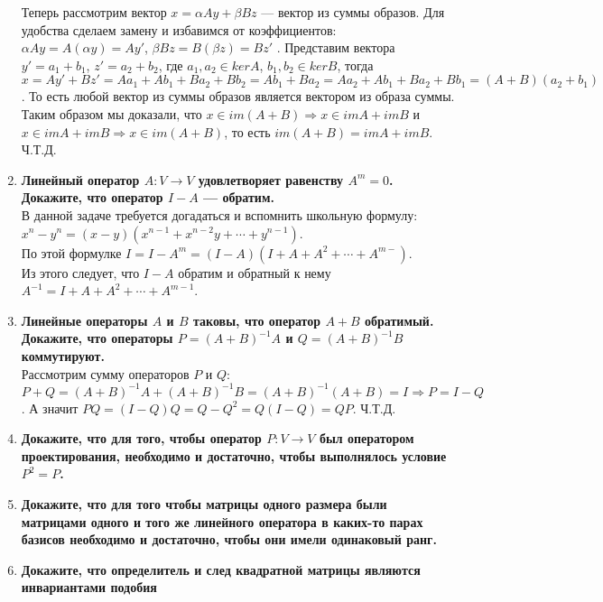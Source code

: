 \documentclass[12pt]{article} %
\begin{document}
\begin{enumerate}
    Теперь рассмотрим вектор $x = \alpha Ay + \beta Bz$ --- вектор из суммы образов. Для удобства сделаем замену и избавимся от коэффициентов: $\alpha Ay = A(\alpha y) = Ay'$, $\beta B z = B(\beta z) = Bz'$ . Представим вектора $y' = a_1 + b_1$, $z' = a_2 + b_2$, где $a_1, a_2 \in kerA$, $b_1, b_2 \in kerB$, тогда $x = Ay' + Bz' = Aa_1 + Ab_1 + Ba_2 + Bb_2 = Ab_1 + Ba_2 = Aa_2 + Ab_1 + Ba_2 + Bb_1 = (A + B)(a_2 + b_1)$. То есть любой вектор из суммы образов является вектором из образа суммы.\\

    Таким образом мы доказали, что $x \in im(A +B) \Rightarrow x \in imA + imB$ и $x \in imA + imB \Rightarrow x \in im(A +B)$, то есть $im(A + B) = imA + imB$. Ч.Т.Д.
    
    \item \textbf{Линейный оператор $A: V \rightarrow V$ удовлетворяет равенству $A^m = 0$. Докажите, что оператор $I - A$ --- обратим.}\\

    В данной задаче требуется догадаться и вспомнить школьную формулу: $x^n - y^n = (x - y)(x^{n - 1} + x^{n - 2}y + \cdots + y^{n - 1})$.\\
    По этой формулке $I = I - A^m = (I - A)(I + A + A^2 + \cdots + A^{m - })$.\\
    Из этого следует, что $I - A$ обратим и обратный к нему  $A^{-1} = I + A + A^2 + \cdots + A^{m - 1}$.\\
    
    \item \textbf{Линейные операторы $A$ и $B$ таковы, что оператор $A + B$ обратимый. Докажите, что операторы $P = (A + B)^{-1}A$ и $Q = (A + B)^{-1}B$ коммутируют.}\\

    Рассмотрим сумму операторов $P$ и $Q$: $P + Q = (A + B)^{-1}A + (A + B)^{-1}B = (A + B)^{-1}(A + B) = I \Rightarrow P = I - Q$. А значит $PQ = (I - Q)Q = Q - Q^2 = Q(I - Q) = QP$. Ч.Т.Д.\\
    
    \item \textbf{Докажите, что для того, чтобы оператор $P: V \rightarrow V$ был оператором проектирования, необходимо и достаточно, чтобы выполнялось условие $P^2 = P$.}
    
    \item \textbf{Докажите, что для того чтобы матрицы одного размера были матрицами одного и того же линейного оператора в каких-то парах базисов необходимо и достаточно, чтобы они имели одинаковый ранг.}
    \item \textbf{Докажите, что определитель и след квадратной матрицы являются инвариантами подобия}


\end{enumerate}
\end{document}
